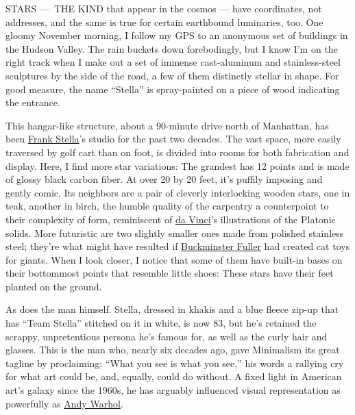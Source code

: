 STARS ---~THE KIND that appear in the cosmos --- have coordinates, not
addresses, and the same is true for certain earthbound luminaries, too.
One gloomy November morning, I follow my GPS to an anonymous set of
buildings in the Hudson Valley. The rain buckets down forebodingly, but
I know I'm on the right track when I make out a set of immense
cast-aluminum and stainless-steel sculptures by the side of the road, a
few of them distinctly stellar in shape. For good measure, the name
``Stella'' is spray-painted on a piece of wood indicating the entrance.

This hangar-like structure, about a 90-minute drive north of Manhattan,
has been
\href{https://www.nytimes3xbfgragh.onion/2019/02/17/arts/design/frank-stella-black-paintings.html}{Frank
Stella}'s studio for the past two decades. The vast space, more easily
traversed by golf cart than on foot, is divided into rooms for both
fabrication and display. Here, I find more star variations: The grandest
has 12 points and is made of glossy black carbon fiber. At over 20 by 20
feet, it's puffily imposing and gently comic. Its neighbors are a pair
of cleverly interlocking wooden stars, one in teak, another in birch,
the humble quality of the carpentry a counterpoint to their complexity
of form, reminiscent of
\href{https://www.nytimes3xbfgragh.onion/2017/11/16/t-magazine/christies-da-vinci-auction-who-was-there.html}{da
Vinci}'s illustrations of the Platonic solids. More futuristic are two
slightly smaller ones made from polished stainless steel; they're what
might have resulted if
\href{https://www.nytimes3xbfgragh.onion/2013/12/17/t-magazine/gallery-paying-tribute-to-buckminster-fuller.html}{Buckminster
Fuller} had created cat toys for giants. When I look closer, I notice
that some of them have built-in bases on their bottommost points that
resemble little shoes: These stars have their feet planted on the
ground.

As does the man himself. Stella, dressed in khakis and a blue fleece
zip-up that has ``Team Stella'' stitched on it in white, is now 83, but
he's retained the scrappy, unpretentious persona he's famous for, as
well as the curly hair and glasses. This is the man who, nearly six
decades ago, gave Minimalism its great tagline by proclaiming: ``What
you see is what you see,'' his words a rallying cry for what art could
be, and, equally, could do without. A fixed light in American art's
galaxy since the 1960s, he has arguably influenced visual representation
as powerfully as
\href{https://www.nytimes3xbfgragh.onion/2018/05/02/t-magazine/andy-warhol-photo-portraits.html}{Andy
Warhol}.

